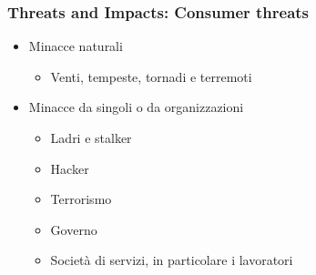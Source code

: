 \begin{frame}
  \frametitle{Threats and Impacts: Consumer threats}
  \begin{itemize}[<+- | alert@+>]
  \item Minacce naturali
	\begin{itemize}
	\item Venti, tempeste, tornadi e terremoti
	\end{itemize}
	 \item Minacce da singoli o da organizzazioni
	\begin{itemize}
	\item Ladri e stalker
	\item Hacker
	\item Terrorismo
	\item Governo
	\item Società di servizi, in particolare i lavoratori
	\end{itemize}
  \end{itemize}
\end{frame}



